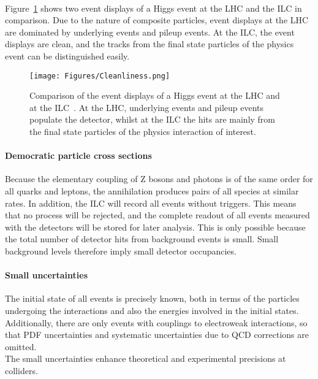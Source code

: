 \\Figure~\ref{fig:Cleanliness} shows two event displays of a Higgs event at the LHC and the ILC in comparison.
Due to the nature of composite particles, event displays at the LHC are dominated by underlying events and pileup events.
At the ILC, the event displays are clean, and the tracks from the final state particles of the physics event can be distinguished easily.
\begin{figure}
\centering
\texttt{[image: Figures/Cleanliness.png]}
\caption[Clean environment at the ILC]{Comparison of the event displays of a Higgs event at the  LHC and at the ILC~\cite[based on p. 4]{ILCPhysics_Thomson}.
At the LHC, underlying events and pileup events populate the detector, whilst at the ILC the hits are mainly from the final state particles of the physics interaction of interest.
}
\label{fig:Cleanliness}
\end{figure}

\paragraph{Democratic particle cross sections}
Because the elementary coupling of Z bosons and photons is of the same order for all quarks and leptons, the \positron\electron annihilation produces pairs of all species at similar rates.
In addition, the ILC will record all events without triggers.
This means that no process will be rejected, and the complete readout of all events measured with the detectors will be stored for later analysis.
This is only possible because the total number of detector hits from background events is small.
Small background levels therefore imply small detector occupancies.

\paragraph{Small uncertainties}
The initial state of all events is precisely known, both in terms of the particles undergoing the interactions and also the energies involved in the initial states.
Additionally, there are only events with couplings to electroweak interactions, so that PDF uncertainties and systematic uncertainties due to QCD corrections are omitted.
\\The small uncertainties enhance theoretical and experimental precisions at \positron\electron colliders.

